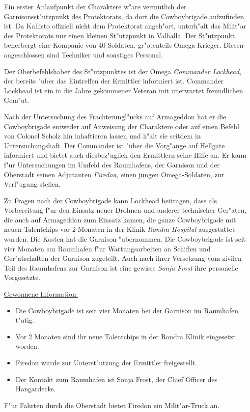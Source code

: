 
Ein erster Anlaufpunkt der Charaktere w"are vermutlich der Garnisonsst"utzpunkt des Protektorats, da dort die Cowboybrigade aufzufinden ist. Da Kallisto offiziell nicht dem Protektorat angeh"ort, unterh"alt das Milit"ar des Protektorats nur einen kleinen St"utzpunkt in Valhalla. Der St"utzpunkt beherbergt eine Kompanie von 40 Soldaten, gr"o\3tenteils Omega Krieger. Diesen angeschlossen sind Techniker und sonstiges Personal.

Der Oberbefehlshaber des St"utzpunktes ist der Omega \emph{Commander Lockhead}, der bereits "uber das Eintreffen der Ermittler informiert ist. Commander Lockhead ist ein in die Jahre gekommener Veteran mit unerwartet freundlichen Gem"ut. 

Nach der Untersuchung des Frachterungl"ucks auf Armageddon hat er die Cowboybrigade entweder auf Anweisung der Charaktere oder auf einen Befehl von Colonel Scholz hin inhaftieren lassen und h"alt sie seitdem in Untersuchungshaft. Der Commander ist "uber die Vorg"ange auf Hellgate informiert und bietet auch diesbez"uglich den Ermittlern seine Hilfe an. Er kann f"ur Untersuchungen im Umfeld des Raumhafens, der Garnison und der Oberstadt seinen Adjutanten \emph{Firedon}, einen jungen Omega-Soldaten, zur Verf"ugung stellen. 

Zu Fragen nach der Cowboybrigade kann Lockhead beitragen, dass als Vorbereitung f"ur den Einsatz neuer Drohnen und anderer technischer Ger"aten, die auch auf Armageddon zum Einsatz kamen, die ganze Cowboybrigade mit neuen Talentchips vor 2 Monaten in der Klinik \emph{Rondra Hospital} ausgestattet wurden. Die Kosten hat die Garnison "ubernommen. Die Cowboybrigade ist seit vier Monaten am Raumhafen f"ur Wartungsarbeiten an Schiffen und Ger"atschaften der Garnison zugeteilt. Auch nach ihrer Versetzung vom zivilen Teil des Raumhafens zur Garnison ist eine gewisse \emph{Sonja Frost} ihre personelle Vorgesetzte.

\begin{remarks}
	\underline{Gewonnene Information:}
	
	\begin{itemize}
		\item Die Cowboybrigade ist seit vier Monaten bei der Garnison im Raumhafen t"atig. 
		\item Vor 2 Monaten sind ihr neue Talentchips in der Rondra Klinik eingesetzt worden.
		\item Firedon wurde zur Unterst"utzung der Ermittler freigestellt.
		\item Der Kontakt zum Raumhafen ist Sonja Frost, der Chief Officer des Hangardecks.
	\end{itemize}

	F"ur Fahrten durch die Oberstadt bietet Firedon ein Milit"ar-Truck an.
	 
\end{remarks}

